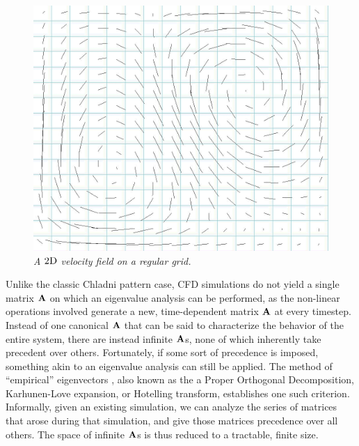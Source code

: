 \documentclass[11pt]{article}
\begin{document}
\begin{figure}
		\centering
		\includegraphics[height=0.3\textwidth]{Figures/velocity_field.png}
		\caption{\em A $2\textnormal{D}$ velocity field on a regular grid.}
		\label{fig:velocity-field}
\end{figure}

Unlike the classic Chladni pattern case, CFD simulations do not yield a single matrix $\mathbf{A}$ on which an eigenvalue analysis can be performed, as the non-linear operations involved generate a new, time-dependent matrix $\mathbf{A}$ at every timestep. Instead of one canonical $\mathbf{A}$ that can be said to characterize the behavior of the entire system, there are instead infinite $\mathbf{A}$s, none of which inherently take precedent over others. Fortunately, if some sort of precedence is imposed, something akin to an eigenvalue analysis can still be applied.
The method of ``empirical'' eigenvectors \cite{Ryckelynck2005}, also known as the a Proper Orthogonal Decomposition, Karhunen-Love expansion, or Hotelling transform, establishes one such criterion. Informally, given an existing simulation, we can analyze the series of matrices that arose during that simulation, and give those matrices precedence over all others. The space of infinite $\mathbf{A}$s is thus reduced to a tractable, finite size.


\end{document}
